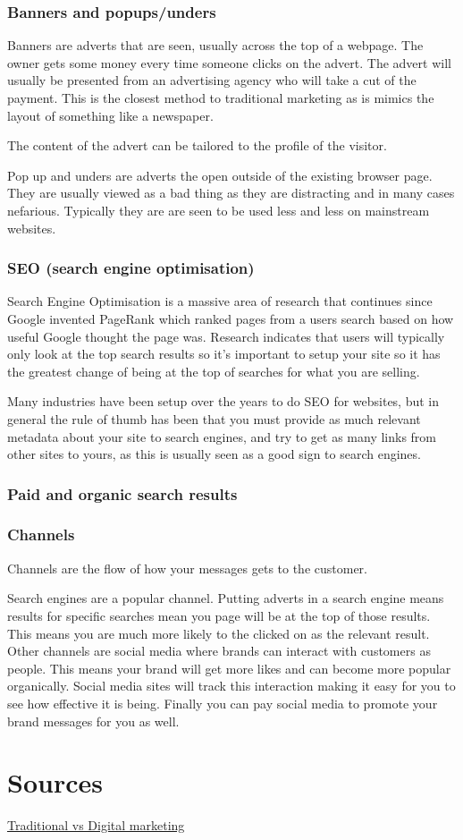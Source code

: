 \documentclass{article}
\begin{document}
\subsubsection{Banners and popups/unders}
Banners are adverts that are seen, usually across the top of a webpage. The owner gets some money every time someone clicks on the advert. The advert will usually be presented from an advertising agency who will take a cut of the payment.
This is the closest method to traditional marketing as is mimics the layout of something like a newspaper.

The content of the advert can be tailored to the profile of the visitor.

Pop up and unders are adverts the open outside of the existing browser page. They are usually viewed as a bad thing as they are distracting and in many cases nefarious. Typically they are are seen to be used less and less on mainstream websites.

\subsubsection{SEO (search engine optimisation)}
Search Engine Optimisation is a massive area of research that continues since Google invented PageRank which ranked pages from a users search based on how useful Google thought the page was.
Research indicates that users will typically only look at the top search results so it's important to setup your site so it has the greatest change of being at the top of searches for what you are selling.

Many industries have been setup over the years to do SEO for websites, but in general the rule of thumb has been that you must provide as much relevant metadata about your site to search engines, and try to get as many links from other sites to yours, as this is usually seen as a good sign to search engines.

\subsubsection{Paid and organic search results}

\subsubsection{Channels}
Channels are the flow of how your messages gets to the customer.

Search engines are a popular channel. Putting adverts in a search engine means results for specific searches mean you page will be at the top of those results. This means you are much more likely to the clicked on as the relevant result.
Other channels are social media where brands can interact with customers as people. This means your brand will get more likes and can become more popular organically. Social media sites will track this interaction making it easy for you to see how effective it is being.
Finally you can pay social media to promote your brand messages for you as well.


\section{Sources}

\href{https://www.statista.com/statistics/693449/digital-vs-traditional-marketing-budget-change-according-to-cmos-usa/} {Traditional vs Digital marketing} \\
\end{document}
